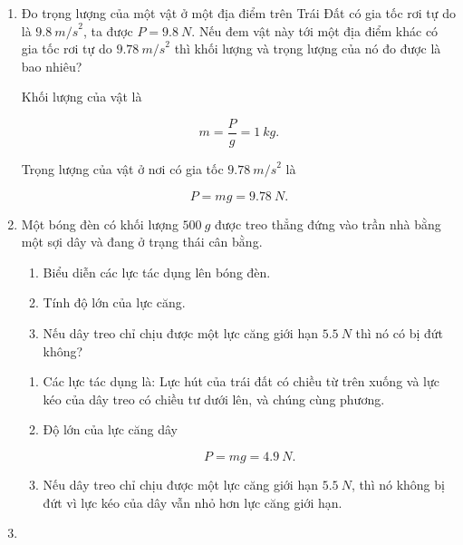 \begin{enumerate}[label=\bfseries Bài \arabic*:,leftmargin=1.5cm]
{		
	}
	
	
	\item {}
	
	
	{Đo trọng lượng của một vật ở một địa điểm trên Trái Đất có gia tốc rơi tự do là $\SI{9,8}{m/s}^2$, ta được $P = \SI{9,8}{N}$. Nếu đem vật này tới một địa điểm khác có gia tốc rơi tự do $\SI{9,78}{m/s}^2$ thì khối lượng và trọng lượng của nó đo được là bao nhiêu?
	}
	
	\hideall
	{
		Khối lượng của vật là
		
		$$ m = \dfrac{P}{g} = \SI{1}{kg}.$$
		
		Trọng lượng của vật ở nơi có gia tốc $\SI{9,78}{m/s}^2$ là
		
		$$P= mg = \SI{9,78}{N}.$$
	}
	\item {}
	
	
	{Một bóng đèn có khối lượng $\SI{500}{g}$ được treo thẳng đứng vào trần nhà bằng một sợi dây và đang ở trạng thái cân bằng.
		\begin{enumerate}[label=\alph*)]
			\item Biểu diễn các lực tác dụng lên bóng đèn.
			\item Tính độ lớn của lực căng. 
			\item Nếu dây treo chỉ chịu được một lực căng giới hạn $\SI{5,5}{N}$ thì nó có bị đứt không?
		\end{enumerate}
		
	}
	
	\hideall
	{
		\begin{enumerate}[label=\alph*)]
			\item Các lực tác dụng là: Lực hút của trái đất có chiều từ trên xuống và lực kéo của dây treo có chiều tư dưới lên, và chúng cùng phương.
			
			\item Độ lớn của lực căng dây 
			
			$$P= mg = \SI{4,9}{N}.$$
			
			\item 
			
			Nếu dây treo chỉ chịu được một lực căng giới hạn $\SI{5,5}{N}$, thì nó không bị đứt vì lực kéo của dây vẫn nhỏ hơn lực căng giới hạn.
		\end{enumerate}
	}
	\item {}
	

\end{enumerate}
